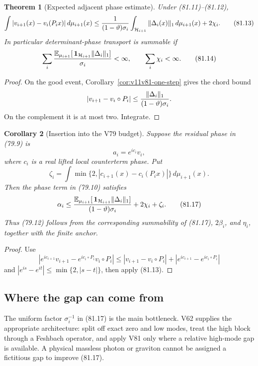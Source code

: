 \documentclass[11pt]{article}
\newtheorem{theorem}{Theorem}[section]
\newtheorem{corollary}[theorem]{Corollary}
\begin{document}
\begin{theorem}[Expected adjacent phase estimate]
\label{thm:v11v81-random}
Under (81.11)--(81.12),
\[
 \int|v_{i+1}(x)-v_i(P_ix)|\,d\mu_{i+1}(x)
 \le {1\over(1-\vartheta)\sigma_i}
      \int_{{\cal H}_{i+1}}\|\Delta_i(x)\|_1\,d\mu_{i+1}(x)
      +2\chi_i.                                              \tag{81.13}
\]
In particular determinant-phase transport is summable if
\[
 \sum_i{\mathbb E_{\mu_{i+1}}
       [\,{\bf1}_{{\cal H}_{i+1}}\|\Delta_i\|_1]\over\sigma_i}
 <\infty,\qquad
 \sum_i\chi_i<\infty.                                       \tag{81.14}
\]
\end{theorem}

\begin{proof}
On the good event, Corollary~\ref{cor:v11v81-one-step} gives the chord
bound
\[
 |v_{i+1}-v_i\circ P_i|
 \le{\|\Delta_i\|_1\over(1-\vartheta)\sigma_i}.
\]
On the complement it is at most two.  Integrate.
\end{proof}

\begin{corollary}[Insertion into the V79 budget]
\label{cor:v11v81-budget}
Suppose the residual phase in (79.9) is
\[
                            a_i=e^{ic_i}v_i,                 \tag{81.15}
\]
where \(c_i\) is a real lifted local counterterm phase.  Put
\[
 \zeta_i=\int\min\{2,|c_{i+1}(x)-c_i(P_ix)|\}\,
                         d\mu_{i+1}(x).                      \tag{81.16}
\]
Then the phase term in (79.10) satisfies
\[
 \alpha_i
 \le { {\mathbb E}_{\mu_{i+1}}
       [\,{\bf1}_{{\cal H}_{i+1}}\|\Delta_i\|_1]
       \over(1-\vartheta)\sigma_i}
       +2\chi_i+\zeta_i.                                    \tag{81.17}
\]
Thus (79.12) follows from the corresponding summability of
(81.17), \(2\beta_i\), and \(\eta_i\), together with the finite anchor.
\end{corollary}

\begin{proof}
Use
\[
 |e^{ic_{i+1}}v_{i+1}-e^{ic_i\circ P_i}v_i\circ P_i|
 \le |v_{i+1}-v_i\circ P_i|
     +|e^{ic_{i+1}}-e^{ic_i\circ P_i}|
\]
and \(|e^{is}-e^{it}|\le\min\{2,|s-t|\}\), then apply (81.13).
\end{proof}

\subsection{Where the gap can come from}

The uniform factor \(\sigma_i^{-1}\) in (81.17) is the main
bottleneck.  V62 supplies the appropriate architecture: split off
exact zero and low modes, treat the high block through a Feshbach
operator, and apply V81 only where a relative high-mode gap is
available.  A physical massless photon or graviton cannot be assigned
a fictitious gap to improve (81.17).
\end{document}
